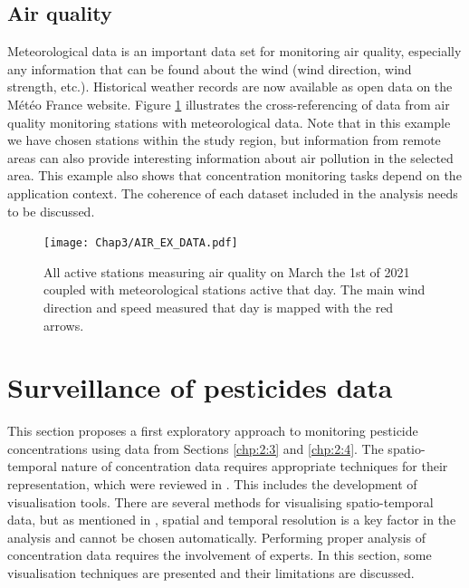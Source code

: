 \subsection{Air quality}

Meteorological data is an important data set for monitoring air quality, especially any information that can be found about the wind (wind direction, wind strength, etc.). Historical weather records are now available as open data on the Météo France \cite{ SYNOP } website. Figure \ref{fig:air_ex} illustrates the cross-referencing of data from air quality monitoring stations with meteorological data. Note that in this example we have chosen stations within the study region, but information from remote areas can also provide interesting information about air pollution in the selected area. This example also shows that concentration monitoring tasks depend on the application context. The coherence of each dataset included in the analysis needs to be discussed.

\begin{figure}[ht]
    \centering
    \texttt{[image: Chap3/AIR\_EX\_DATA.pdf]}
    \caption{All active stations measuring air quality on March the 1st of 2021 coupled with meteorological stations active that day. The main wind direction and speed measured that day is mapped with the red arrows.}
    \label{fig:air_ex}
\end{figure}

\section{Surveillance of pesticides data}\label{chp:2:5}

This section proposes a first exploratory approach to monitoring pesticide concentrations using data from Sections \ref{chp:2:3} and \ref{chp:2:4}. The spatio-temporal nature of concentration data requires appropriate techniques for their representation, which were reviewed in \cite{Andrienko2003,cressie2015,Maimon2010}. This includes the development of visualisation tools. There are several methods for visualising spatio-temporal data, but as mentioned in \cite{Ansari2019}, spatial and temporal resolution is a key factor in the analysis and cannot be chosen automatically. Performing proper analysis of concentration data requires the involvement of experts. In this section, some visualisation techniques are presented and their limitations are discussed. 

